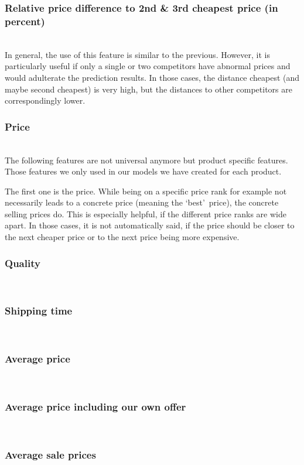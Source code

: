 \subsubsection{Relative price difference to 2nd \& 3rd cheapest price (in percent)}
\label{sec:pricediff3}
	~\\
	In general, the use of this feature is similar to the previous. However, it is particularly useful if only a single or two competitors have abnormal prices and would adulterate the prediction results. In those cases, the distance cheapest (and maybe second cheapest) is very high, but the distances to other competitors are correspondingly lower.
\subsubsection{Price}
	~\\
	The following features are not universal anymore but product specific features. Those features we only used in our models we have created for each product.

	The first one is the price. While being on a specific price rank for example not necessarily leads to a concrete price (meaning the \lq{best}\rq\ price), the concrete selling prices do. This is especially helpful, if the different price ranks are wide apart. In those cases, it is not automatically said, if the price should be closer to the next cheaper price or to the next price being more expensive.
\subsubsection{Quality}
	~\\
\subsubsection{Shipping time}
	~\\
\subsubsection{Average price}
	~\\
\subsubsection{Average price including our own offer}
	~\\
\subsubsection{Average sale prices}
	~\\
